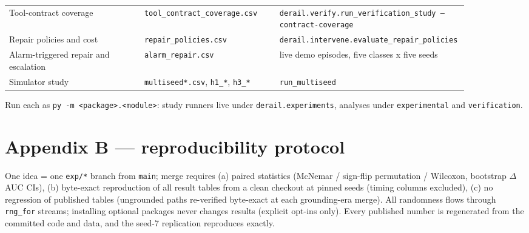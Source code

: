 \documentclass[11pt]{article}
\begin{document}
\begin{longtable}{>{\raggedright\arraybackslash}p{0.293\linewidth}>{\raggedright\arraybackslash}p{0.293\linewidth}>{\raggedright\arraybackslash}p{0.293\linewidth}}
Tool-contract coverage & \texttt{tool\_\allowbreak{}contract\_\allowbreak{}coverage.csv} & \texttt{derail.verify.run\_\allowbreak{}verification\_\allowbreak{}study --contract-coverage} \\
Repair policies and cost & \texttt{repair\_\allowbreak{}policies.csv} & \texttt{derail.intervene.evaluate\_\allowbreak{}repair\_\allowbreak{}policies} \\
Alarm-triggered repair and escalation & \texttt{alarm\_\allowbreak{}repair.csv} & live demo episodes, five classes x five seeds \\
Simulator study & \texttt{multiseed*.csv}, \texttt{h1\_\allowbreak{}*}, \texttt{h3\_\allowbreak{}*} & \texttt{run\_\allowbreak{}multiseed} \\
\bottomrule
\end{longtable}


Run each as \texttt{py -m <package>.<module>}: study runners live under \texttt{derail.experiments}, analyses under \texttt{experimental} and \texttt{verification}.


\section{Appendix B --- reproducibility protocol}


One idea = one \texttt{exp/\allowbreak{}*} branch from \texttt{main}; merge requires (a) paired statistics (McNemar / sign-flip permutation / Wilcoxon, bootstrap $\Delta$AUC CIs), (b) byte-exact reproduction of all result tables from a clean checkout at pinned seeds (timing columns excluded), (c) no regression of published tables (ungrounded paths re-verified byte-exact at each grounding-era merge). All randomness flows through \texttt{rng\_\allowbreak{}for} streams; installing optional packages never changes results (explicit opt-ins only). Every published number is regenerated from the committed code and data, and the seed-7 replication reproduces exactly.
\end{document}
